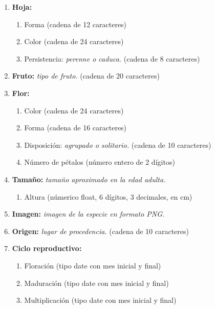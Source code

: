 \documentclass[10pt,a4paper]{article}
\begin{document}
\begin{enumerate}[label={RD\arabic*.} ,leftmargin=2.8\parindent]
\begin{enumerate}[label={RD10.\arabic*.}]
	\medskip
	\item
		\textbf{Hoja:}
	\begin{enumerate}[label=-]
		\item Forma (cadena de 12 caracteres)
		\item Color (cadena de 24 caracteres)
		\item Persistencia: \textit{perenne o caduca.} (cadena de 8 caracteres)
	\end{enumerate}

	\medskip	
	\item
		\textbf{Fruto:} \textit{tipo de fruto.} (cadena de 20 caracteres)

	\medskip
	\item
		\textbf{Flor:}
	\begin{enumerate} [label=-]
		\item Color (cadena de 24 caracteres)
		\item Forma (cadena de 16 caracteres)
		\item Disposición: \textit{agrupado o solitario.} (cadena de 10 caracteres)
		\item Número de pétalos (número entero de 2 dígitos)
	\end{enumerate}

	\medskip
	\item
		\textbf{Tamaño:} \textit{tamaño aproximado en la edad adulta.}
	\begin{enumerate}[label=-]
		\item Altura (númerico float, 6 dígitos, 3 decimales, en cm)
	\end{enumerate}
	
	\medskip	
	\item
		\textbf{Imagen:} \textit{imagen de la especie en formato PNG.}

	\medskip 
	\item
		\textbf{Origen:} \textit{lugar de procedencia.} (cadena de 10 caracteres)
		
	\medskip 
	\item
		\textbf{Ciclo reproductivo:}
	\begin{enumerate} [label=-]
		\item Floración (tipo date con mes inicial y final)
		\item Maduración (tipo date con mes inicial y final)
		\item Multiplicación (tipo date con mes inicial y final)
	\end{enumerate}
	\medskip \medskip
		\end{enumerate}
	

\end{enumerate}
\end{document}
